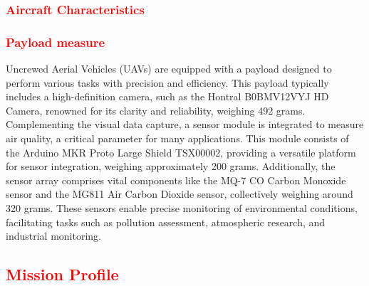 \documentclass[12 pt]{article}
\begin{document}
\subsubsection{\textcolor{red}{Aircraft Characteristics}}
\begin{table}[h]
\centering
{}
\caption{Initial Mission Requirements}
\label{Mission Requirements}
\end{table}

\subsubsection{\textcolor{red}{Payload measure}}
Uncrewed Aerial Vehicles (UAVs) are equipped with a payload designed to perform various tasks with precision and efficiency. This payload typically includes a high-definition camera, such as the Hontral B0BMV12VYJ HD Camera, renowned for its clarity and reliability, weighing 492 grams. Complementing the visual data capture, a sensor module is integrated to measure air quality, a critical parameter for many applications. This module consists of the Arduino MKR Proto Large Shield TSX00002, providing a versatile platform for sensor integration, weighing approximately 200 grams. Additionally, the sensor array comprises vital components like the MQ-7 CO Carbon Monoxide sensor and the MG811 Air Carbon Dioxide sensor, collectively weighing around 320 grams. These sensors enable precise monitoring of environmental conditions, facilitating tasks such as pollution assessment, atmospheric research, and industrial monitoring.

\subsection{\textcolor{red}{Mission Profile}}
\end{document}
